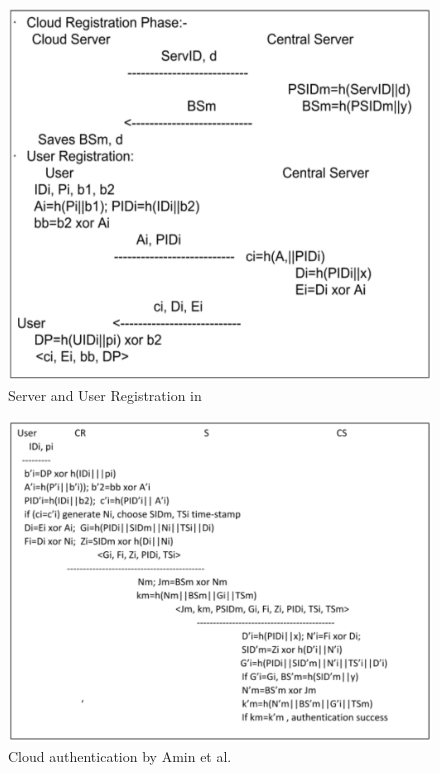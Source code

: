 \begin{figure}[!ht]
\centering
\includegraphics[scale=.7]{src/Figures/chap2/7.eps}
\caption{Server and User Registration in \cite{chap2-key20}}\label{chap2-fig7}
\end{figure}

\newpage

\begin{figure}[!ht]
\centering
\includegraphics[scale=.85]{src/Figures/chap2/8.eps}
\caption{Cloud authentication by Amin et al. \cite{chap2-key20}}\label{chap2-fig8}
\end{figure}

